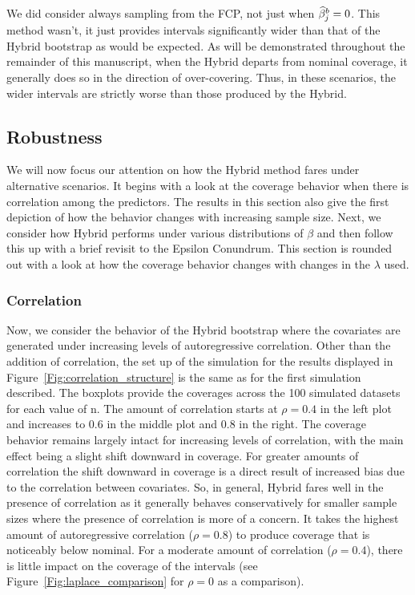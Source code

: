 We did consider always sampling from the FCP, not just when $\widehat{\beta}_j^b = 0$. This method wasn't, it just provides intervals significantly wider than that of the Hybrid bootstrap as would be expected. As will be demonstrated throughout the remainder of this manuscript, when the Hybrid departs from nominal coverage, it generally does so in the direction of over-covering. Thus, in these scenarios, the wider intervals are strictly worse than those produced by the Hybrid.

\subsection{Robustness}
\label{Sec:robustness}

We will now focus our attention on how the Hybrid method fares under alternative scenarios. It begins with a look at the coverage behavior when there is correlation among the predictors. The results in this section also give the first depiction of how the behavior changes with increasing sample size. Next, we consider how Hybrid performs under various distributions of $\beta$ and then follow this up with a brief revisit to the Epsilon Conundrum. This section is rounded out with a look at how the coverage behavior changes with changes in the $\lambda$ used.

\subsubsection{Correlation}
\label{Sec:correlation}

Now, we consider the behavior of the Hybrid bootstrap where the covariates are generated under increasing levels of autoregressive correlation. Other than the addition of correlation, the set up of the simulation for the results displayed in Figure~\ref{Fig:correlation_structure} is the same as for the first simulation described. The boxplots provide the coverages across the 100 simulated datasets for each value of n. The amount of correlation starts at $\rho = 0.4$ in the left plot and increases to $0.6$ in the middle plot and $0.8$ in the right. The coverage behavior remains largely intact for increasing levels of correlation, with the main effect being a slight shift downward in coverage. For greater amounts of correlation the shift downward in coverage is a direct result of increased bias due to the correlation between covariates. So, in general, Hybrid fares well in the presence of correlation as it generally behaves conservatively for smaller sample sizes where the presence of correlation is more of a concern. It takes the highest amount of autoregressive correlation ($\rho = 0.8$) to produce coverage that is noticeably below nominal. For a moderate amount of correlation ($\rho = 0.4$), there is little impact on the coverage of the intervals (see Figure~\ref{Fig:laplace_comparison} for $\rho = 0$ as a comparison).

